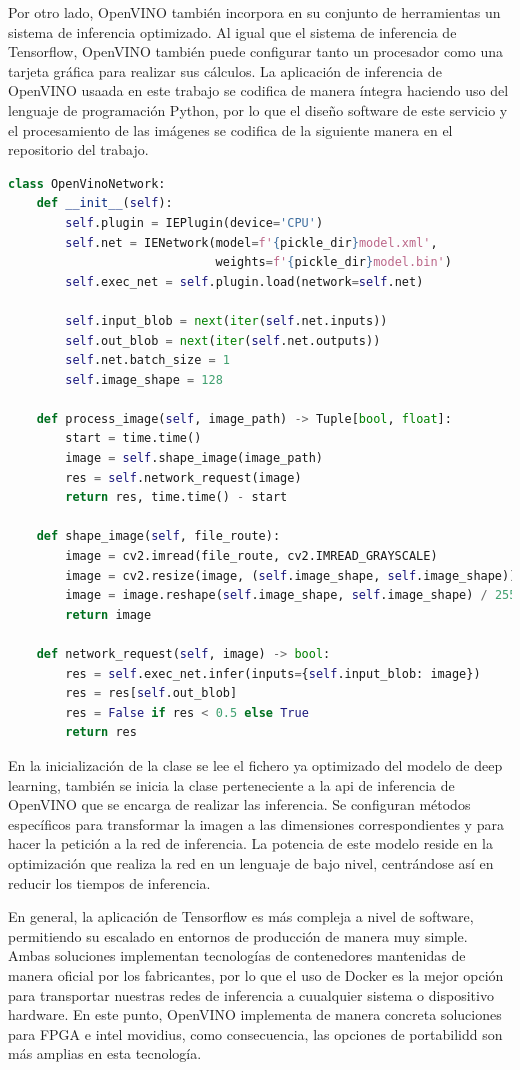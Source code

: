 Por otro lado, OpenVINO también incorpora en su conjunto de herramientas un sistema de inferencia optimizado.
Al igual que el sistema de inferencia de Tensorflow, OpenVINO también puede configurar tanto un procesador como una tarjeta gráfica para realizar sus cálculos.
La aplicación de inferencia de OpenVINO usaada en este trabajo se codifica de manera íntegra haciendo uso del lenguaje de programación Python,
por lo que el diseño software de este servicio y el procesamiento de las imágenes se codifica de la siguiente manera en el repositorio del trabajo.

\begin{lstlisting}[caption=Clase de OpenVINO de la aplicación del trabajo.,
  label=b_label,
  language=python]
    class OpenVinoNetwork:
    def __init__(self):
        self.plugin = IEPlugin(device='CPU')
        self.net = IENetwork(model=f'{pickle_dir}model.xml',
                             weights=f'{pickle_dir}model.bin')
        self.exec_net = self.plugin.load(network=self.net)

        self.input_blob = next(iter(self.net.inputs))
        self.out_blob = next(iter(self.net.outputs))
        self.net.batch_size = 1
        self.image_shape = 128

    def process_image(self, image_path) -> Tuple[bool, float]:
        start = time.time()
        image = self.shape_image(image_path)
        res = self.network_request(image)
        return res, time.time() - start

    def shape_image(self, file_route):
        image = cv2.imread(file_route, cv2.IMREAD_GRAYSCALE)
        image = cv2.resize(image, (self.image_shape, self.image_shape))
        image = image.reshape(self.image_shape, self.image_shape) / 255.0
        return image

    def network_request(self, image) -> bool:
        res = self.exec_net.infer(inputs={self.input_blob: image})
        res = res[self.out_blob]
        res = False if res < 0.5 else True
        return res
\end{lstlisting}

En la inicialización de la clase se lee el fichero ya optimizado del modelo de deep learning, también se inicia la clase
perteneciente a la api de inferencia de OpenVINO que se encarga de realizar las inferencia.
Se configuran métodos específicos para transformar la imagen a las dimensiones correspondientes y para hacer la petición a la red de inferencia.
La potencia de este modelo reside en la optimización que realiza la red en un lenguaje de bajo nivel, centrándose así en reducir los tiempos de inferencia.

En general, la aplicación de Tensorflow es más compleja a nivel de software, permitiendo su escalado en entornos de producción de manera muy simple.
Ambas soluciones implementan tecnologías de contenedores mantenidas de manera oficial por los fabricantes, por lo que el uso de Docker es la mejor opción para transportar
nuestras redes de inferencia a cuualquier sistema o dispositivo hardware.
En este punto, OpenVINO implementa de manera concreta soluciones para FPGA e intel movidius, como consecuencia, las opciones de portabilidd son más amplias en esta tecnología.


